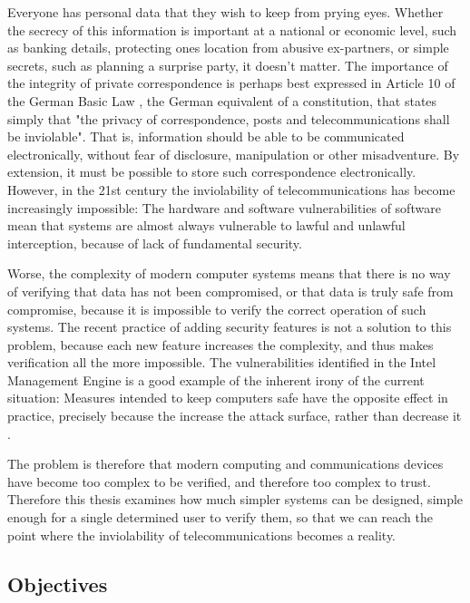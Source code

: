 Everyone has personal data that they wish to keep from prying eyes.
Whether the secrecy of this information is important at a national or economic level, such as banking details, protecting ones location from abusive ex-partners, or simple secrets, such as planning a surprise party, it doesn't matter.
The importance of the integrity of private correspondence is perhaps best expressed in Article 10 of the German Basic Law \cite{Germany}, the German equivalent of a constitution, that states simply that "the privacy of correspondence, posts and telecommunications shall be inviolable".
That is, information should be able to be communicated electronically, without fear of disclosure, manipulation or other misadventure. By extension, it must be possible to store such correspondence electronically.
However, in the 21st century the inviolability of telecommunications has become increasingly impossible: The hardware and software vulnerabilities of software mean that systems are almost always vulnerable to lawful and unlawful interception, because of lack of fundamental security.

Worse, the complexity of modern computer systems means that there is no way of verifying that data has not been compromised, or that data is truly safe from compromise, because it is impossible to verify the correct operation of such systems.
The recent practice of adding security features is not a solution to this problem, because each new feature increases the complexity, and thus makes verification all the more impossible. The vulnerabilities identified in the Intel Management Engine is a good example of the inherent irony of the current situation:
Measures intended to keep computers safe have the opposite effect in practice, precisely because the increase the attack surface, rather than decrease it \cite{IME}.

The problem is therefore that modern computing and communications devices have become too complex to be verified, and therefore too complex to trust.  Therefore this thesis examines how much simpler systems can be designed, simple enough for a single determined user to verify them, so that we can reach the point where the inviolability of telecommunications becomes a reality.



\subsection{Objectives}

